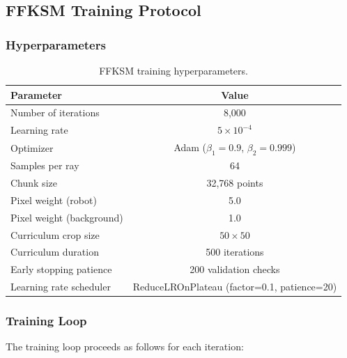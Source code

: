 ﻿\documentclass[12pt,a4paper,oneside]{report}
\begin{document}
\subsection{FFKSM Training Protocol}

\subsubsection{Hyperparameters}

\begin{table}[H]
\centering
\caption{FFKSM training hyperparameters.}
\label{tab:ffksm_hyperparams}
\begin{tabular}{lc}
\toprule
Parameter & Value \\
\midrule
Number of iterations & 8,000 \\
Learning rate & $5 \times 10^{-4}$ \\
Optimizer & Adam ($\beta_1=0.9$, $\beta_2=0.999$) \\
Samples per ray & 64 \\
Chunk size & 32,768 points \\
Pixel weight (robot) & 5.0 \\
Pixel weight (background) & 1.0 \\
Curriculum crop size & $50 \times 50$ \\
Curriculum duration & 500 iterations \\
Early stopping patience & 200 validation checks \\
Learning rate scheduler & ReduceLROnPlateau (factor=0.1, patience=20) \\
\bottomrule
\end{tabular}
\end{table}

\subsubsection{Training Loop}

The training loop proceeds as follows for each iteration:
\end{document}
